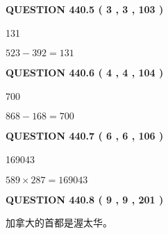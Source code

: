 \documentclass{ctexart}
\begin{document}
{\textbf{\Large{QUESTION
440.5 
 ( 3 , 3 , 103 )
}}}
  
  
 
 
\noindent{}

131
 
 
 
 
\noindent{}

$ %
523 -  %
392=   %
131$
 
 
  
\vspace{0.2in}
  
{\textbf{\Large{QUESTION
440.6 
 ( 4 , 4 , 104 )
}}}
  
  
 
 
\noindent{}

700
 
 
 
 
\noindent{}

$ %
868 -  %
168=   %
700$
 
 
  
\vspace{0.2in}
  
{\textbf{\Large{QUESTION
440.7 
 ( 6 , 6 , 106 )
}}}
  
  
 
 
\noindent{}

169043
 
 
 
 
\noindent{}

$ %
589 \times  %
287=   %
169043$
 
 
  
\vspace{0.2in}
  
{\textbf{\Large{QUESTION
440.8 
 ( 9 , 9 , 201 )
}}}
  
  
 
 
\noindent{}
 
 
加拿大的首都是渥太华。
 
 
 
 
  
\end{document}
